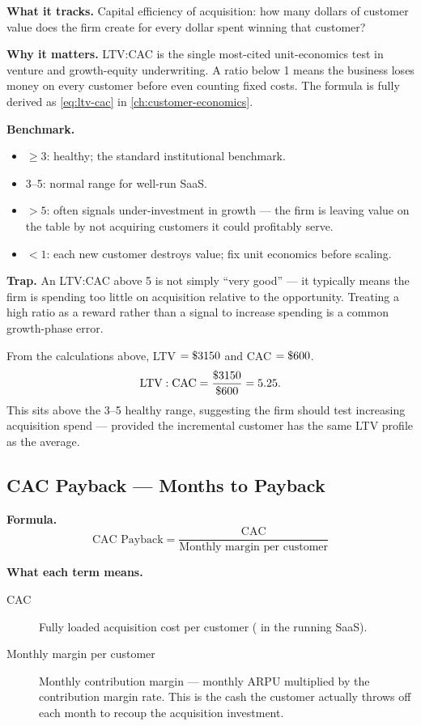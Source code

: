 \textbf{What it tracks.} Capital efficiency of acquisition: how many dollars of customer
value does the firm create for every dollar spent winning that customer?

\textbf{Why it matters.} LTV:CAC is the single most-cited unit-economics test in venture
and growth-equity underwriting. A ratio below 1 means the business loses money on every
customer before even counting fixed costs. The formula is fully derived as \cref{eq:ltv-cac}
in \cref{ch:customer-economics}.

\textbf{Benchmark.}
\begin{itemize}
  \item $\ge 3$: healthy; the standard institutional benchmark.
  \item 3--5: normal range for well-run SaaS.
  \item $> 5$: often signals under-investment in growth --- the firm is leaving value on
    the table by not acquiring customers it could profitably serve.
  \item $< 1$: each new customer destroys value; fix unit economics before scaling.
\end{itemize}

\textbf{Trap.} An LTV:CAC above 5 is not simply ``very good'' --- it typically means the
firm is spending too little on acquisition relative to the opportunity. Treating a high ratio
as a reward rather than a signal to increase spending is a common growth-phase error.

\begin{example}
From the calculations above, LTV $= \$\num{3150}$ and CAC $= \$\num{600}$.
\[
  \mathrm{LTV:CAC} = \frac{\$\num{3150}}{\$\num{600}} = 5.25.
\]
This sits above the 3--5 healthy range, suggesting the firm should test increasing acquisition
spend --- provided the incremental customer has the same LTV profile as the average.
\end{example}


\subsection{CAC Payback --- Months to Payback}

\textbf{Formula.}
\[
  \text{CAC Payback} = \frac{\mathrm{CAC}}{\text{Monthly margin per customer}}
\]

\textbf{What each term means.}
\begin{description}
  \item[CAC] Fully loaded acquisition cost per customer ( in the running SaaS).
  \item[Monthly margin per customer] Monthly contribution margin --- monthly ARPU multiplied
    by the contribution margin rate. This is the cash the customer actually throws off each
    month to recoup the acquisition investment.
\end{description}

